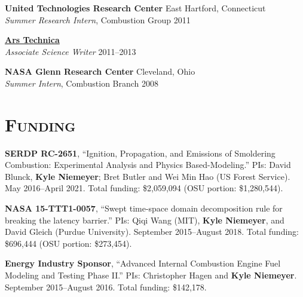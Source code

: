 \documentclass[margin,line,11pt]{res}
\begin{document}
\begin{resume}
\textbf{United Technologies Research Center} \hfill East Hartford, Connecticut \\
\emph{Summer Research Intern}, Combustion Group \hfill 2011

\textbf{\href{http://arstechnica.com/}{Ars Technica}} \\
\emph{Associate Science Writer} \hfill 2011--2013

\textbf{NASA Glenn Research Center} \hfill Cleveland, Ohio \\
\emph{Summer Intern}, Combustion Branch \hfill 2008

\section{\textsc{Funding}}

\textbf{SERDP RC-2651}, ``Ignition, Propagation, and Emissions of Smoldering Combustion: Experimental Analysis and Physics Based-Modeling.'' PIs: David Blunck, \textbf{Kyle Niemeyer}; Bret Butler and Wei Min Hao (US Forest Service). May 2016--April 2021. Total funding: \$2,059,094 (OSU portion: \$1,280,544).

\textbf{NASA 15-TTT1-0057}, ``Swept time-space domain decomposition rule for breaking the latency barrier.'' PIs: Qiqi Wang (MIT), \textbf{Kyle Niemeyer}, and David Gleich (Purdue University). September 2015--August 2018. Total funding: \$696,444 (OSU portion: \$273,454).

\textbf{Energy Industry Sponsor}, ``Advanced Internal Combustion Engine Fuel Modeling and Testing Phase II.'' PIs: Christopher Hagen and \textbf{Kyle Niemeyer}. September 2015--August 2016. Total funding: \$142,178.


\end{resume}
\end{document}
